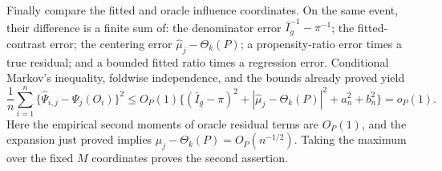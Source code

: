 Finally compare the fitted and oracle influence coordinates.  On the same event, their difference is a finite sum of: the denominator error \(\bar I_g^{-1}-\pi^{-1}\); the fitted-contrast error; the centering error \(\widehat\mu_j-\Theta_k(P)\); a propensity-ratio error times a true residual; and a bounded fitted ratio times a regression error.  Conditional Markov's inequality, foldwise independence, and the bounds already proved yield
\[
 \frac1n\sum_{i=1}^n\{\widehat\Psi_{i,j}-\Psi_j(O_i)\}^2
 \le O_P(1)\{(\bar I_g-\pi)^2
 +|\widehat\mu_j-\Theta_k(P)|^2+a_n^2+b_n^2\}=o_P(1).
\]
Here the empirical second moments of oracle residual terms are \(O_P(1)\), and the expansion just proved implies \(\widehat\mu_j-\Theta_k(P)=O_P(n^{-1/2})\).  Taking the maximum over the fixed \(M\) coordinates proves the second assertion.